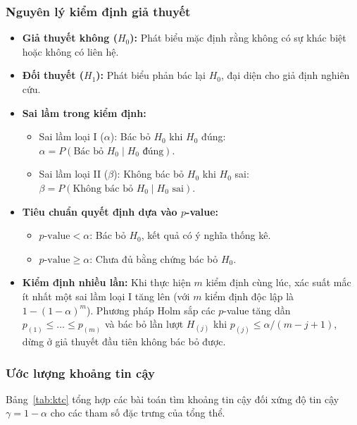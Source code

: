 \documentclass[12pt,a4paper]{article}
\begin{document}
\subsubsection{Nguyên lý kiểm định giả thuyết}
\begin{itemize}
  \item \textbf{Giả thuyết không ($H_0$):} Phát biểu mặc định rằng không có sự khác biệt hoặc
  không có liên hệ.
  \item \textbf{Đối thuyết ($H_1$):} Phát biểu phản bác lại $H_0$, đại diện cho giả định
  nghiên cứu.
  \item \textbf{Sai lầm trong kiểm định:}
  \begin{itemize}
    \item Sai lầm loại I ($\alpha$): Bác bỏ $H_0$ khi $H_0$ đúng:
    $\alpha = P(\text{Bác bỏ } H_0 \mid H_0 \text{ đúng})$.
    \item Sai lầm loại II ($\beta$): Không bác bỏ $H_0$ khi $H_0$ sai:
    $\beta = P(\text{Không bác bỏ } H_0 \mid H_0 \text{ sai})$.
  \end{itemize}
  \item \textbf{Tiêu chuẩn quyết định dựa vào $p$-value:}
  \begin{itemize}
    \item $p\text{-value} < \alpha$: Bác bỏ $H_0$, kết quả có ý nghĩa thống kê.
    \item $p\text{-value} \ge \alpha$: Chưa đủ bằng chứng bác bỏ $H_0$.
  \end{itemize}
  \item \textbf{Kiểm định nhiều lần:} Khi thực hiện $m$ kiểm định cùng lúc, xác suất mắc ít
  nhất một sai lầm loại I tăng lên (với $m$ kiểm định độc lập là $1-(1-\alpha)^m$). Phương pháp
  Holm sắp các $p$-value tăng dần $p_{(1)} \le \dots \le p_{(m)}$ và bác bỏ lần lượt
  $H_{(j)}$ khi $p_{(j)} \le \alpha/(m - j + 1)$, dừng ở giả thuyết đầu tiên không bác bỏ được.
\end{itemize}

\subsubsection{Ước lượng khoảng tin cậy}

Bảng~\ref{tab:ktc} tổng hợp các bài toán tìm khoảng tin cậy đối xứng độ tin cậy
$\gamma = 1-\alpha$ cho các tham số đặc trưng của tổng thể.
\end{document}

